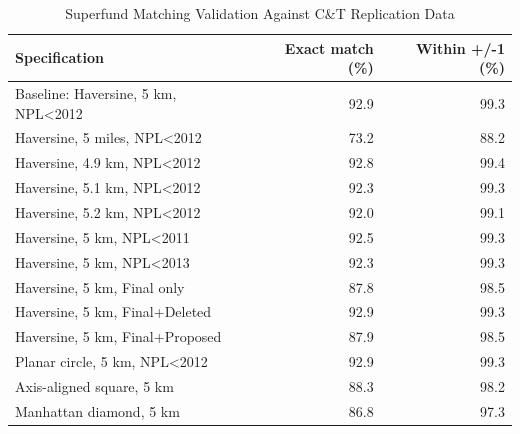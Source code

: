 \begin{table}[h]
\centering
\caption{Superfund Matching Validation Against C\&T Replication Data}
\begin{tabular}{lrr}
\toprule
Specification & Exact match (\%) & Within +/-1 (\%) \\
\midrule
Baseline: Haversine, 5 km, NPL<2012 & 92.9 & 99.3 \\
Haversine, 5 miles, NPL<2012 & 73.2 & 88.2 \\
Haversine, 4.9 km, NPL<2012 & 92.8 & 99.4 \\
Haversine, 5.1 km, NPL<2012 & 92.3 & 99.3 \\
Haversine, 5.2 km, NPL<2012 & 92.0 & 99.1 \\
Haversine, 5 km, NPL<2011 & 92.5 & 99.3 \\
Haversine, 5 km, NPL<2013 & 92.3 & 99.3 \\
Haversine, 5 km, Final only & 87.8 & 98.5 \\
Haversine, 5 km, Final+Deleted & 92.9 & 99.3 \\
Haversine, 5 km, Final+Proposed & 87.9 & 98.5 \\
Planar circle, 5 km, NPL<2012 & 92.9 & 99.3 \\
Axis-aligned square, 5 km & 88.3 & 98.2 \\
Manhattan diamond, 5 km & 86.8 & 97.3 \\
\bottomrule
\end{tabular}
\end{table}
